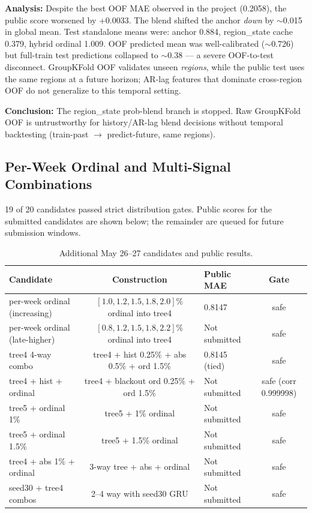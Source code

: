 \documentclass[12pt, a4paper]{article}
\begin{document}
\textbf{Analysis:} Despite the best OOF MAE observed in the project (0.2058), the public score worsened by +0.0033. The blend shifted the anchor \textit{down} by $\sim$0.015 in global mean. Test standalone means were: anchor 0.884, region\_state cache 0.379, hybrid ordinal 1.009. OOF predicted mean was well-calibrated ($\sim$0.726) but full-train test predictions collapsed to $\sim$0.38 --- a severe OOF-to-test disconnect. GroupKFold OOF validates unseen \textit{regions}, while the public test uses the same regions at a future horizon; AR-lag features that dominate cross-region OOF do not generalize to this temporal setting.

\textbf{Conclusion:} The region\_state prob-blend branch is stopped. Raw GroupKFold OOF is untrustworthy for history/AR-lag blend decisions without temporal backtesting (train-past $\rightarrow$ predict-future, same regions).

\subsection{Per-Week Ordinal and Multi-Signal Combinations}
19 of 20 candidates passed strict distribution gates. Public scores for the submitted candidates are shown below; the remainder are queued for future submission windows.

\begin{table}[H]
\centering
\caption{Additional May 26--27 candidates and public results.}
\label{tab:may26}
\begin{tabular}{@{}lclc@{}}
\toprule
\textbf{Candidate} & \textbf{Construction} & \textbf{Public MAE} & \textbf{Gate} \\
\midrule
per-week ordinal (increasing) & $[1.0, 1.2, 1.5, 1.8, 2.0]\%$ ordinal into tree4 & 0.8147 & safe \\
per-week ordinal (late-higher) & $[0.8, 1.2, 1.5, 1.8, 2.2]\%$ ordinal into tree4 & Not submitted & safe \\
tree4 4-way combo & tree4 + hist 0.25\% + abs 0.5\% + ord 1.5\% & 0.8145 (tied) & safe \\
tree4 + hist + ordinal & tree4 + blackout ord 0.25\% + ord 1.5\% & Not submitted & safe (corr 0.999998) \\
tree5 + ordinal 1\% & tree5 + 1\% ordinal & Not submitted & safe \\
tree5 + ordinal 1.5\% & tree5 + 1.5\% ordinal & Not submitted & safe \\
tree4 + abs 1\% + ordinal & 3-way tree + abs + ordinal & Not submitted & safe \\
seed30 + tree4 combos & 2--4 way with seed30 GRU & Not submitted & safe \\
\bottomrule
\end{tabular}
\end{table}
\end{document}

